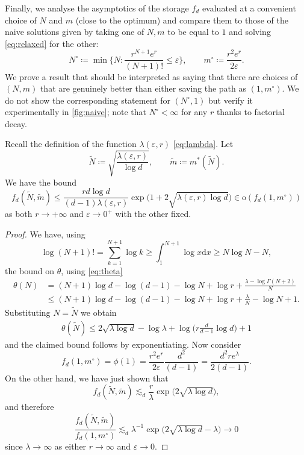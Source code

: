 \documentclass{article}
\def\d{\mathrm{d}}
\def\eps{\varepsilon}
\numberwithin{equation}{section}
\theoremstyle{definition}
\theoremstyle{remark}
\begin{document}
Finally, we analyse the asymptotics of the storage $f_d$ evaluated at a convenient choice of $N$ and $m$ (close to the optimum) and compare them to those of the naive solutions given by taking one of $N, m$ to be equal to $1$ and solving \eqref{eq:relaxed} for the other:
\begin{equation}\label{eq:naiveaxis}
N^\circ \coloneqq \min \bigg\{ N:  \frac{r^{N+1}e^r}{(N+1)!} \leq \eps \bigg\}, \qquad m^\circ \coloneqq \frac{r^2e^r}{2\eps}.
\end{equation}
We prove a result that should be interpreted as saying that there are choices of $(N, m)$ that are genuinely better than either saving the path as $(1, m^\circ)$. We do not show the corresponding statement for $(N^\circ, 1)$ but verify it experimentally in \autoref{fig:naive}; note that $N^\circ < \infty$ for any $r$ thanks to factorial decay.

\begin{proposition}\label{thm:optimal1var}
Recall the definition of the function $\lambda(\eps, r)$ \eqref{eq:lambda}. Let
\[
\widetilde N \coloneqq \sqrt{\frac{\lambda(\eps,r)}{\log d}}, \qquad \widetilde m \coloneqq m^*(\widetilde N).
\]
We have the bound
\[
f_d(\widetilde N, \widetilde m) \leq \frac{r d \log d}{(d-1)\lambda(\eps,r)} \exp\big(1 + 2 \sqrt{\lambda(\eps,r)\log d}\big) \in \mathrm{o}(f_d(1, m^\circ))
\]
as both $r \to +\infty$ and $\eps \to 0^+$ with the other fixed.
\end{proposition}
\begin{proof}
We have, using
\[
\log (N+1)! = \sum_{k = 1}^{N+1} \log k \geq \int_1^{N+1} \log x \d x \geq N \log N - N,
\]
the bound on $\theta$, using \eqref{eq:theta}
\begin{align*}
	\theta(N) &= (N+1)\log d - \log(d-1) - \log N + \log r + \frac{\lambda - \log \Gamma(N+2)}{N} \\
	&\leq (N+1)\log d - \log(d-1) - \log N + \log r + \frac{\lambda}{N} - \log N + 1.
\end{align*}
Substituting $N = \widetilde N$ we obtain
\begin{align*}
	\theta(\widetilde N) \leq 2 \sqrt{\lambda \log d} - \log \lambda + \log \Big( r \frac{d}{d-1} \log d  \Big) + 1
\end{align*}
and the claimed bound follows by exponentiating. Now consider 
\[
f_d(1, m^\circ) = \phi(1) =  \frac{r^2e^r}{2\eps}\frac{d^2}{(d-1)} = \frac{d^2 r e^\lambda}{2(d-1)}.
\]
On the other hand, we have just shown that
\[
f_d(\widetilde N, \widetilde m) \lesssim_d \frac{r}{\lambda} \exp\big( 2\sqrt{\lambda \log d} \big),
\]
and therefore
\[
\frac{f_d(\widetilde N, \widetilde m)}{f_d(1,m^\circ)} \lesssim_d \lambda^{-1} \exp \big( 2 \sqrt{\lambda \log d} - \lambda \big) \to 0
\]
since $\lambda \to \infty$ as either $r \to \infty$ and $\eps \to 0$.
\end{proof}
\end{document}
